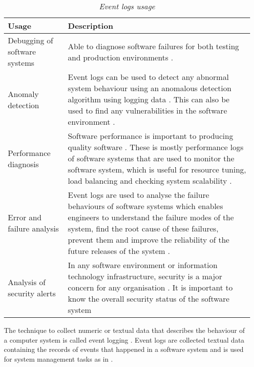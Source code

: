 \begin{table}[!htb]
	\centering
	\small
	\caption[Event logs usage]
	{\textit{Event logs usage}}
	\label{tbl:CH1_EventLogsUsage}
	\begin{tabularx}{\textwidth}{|l|X|}
		\hline \textbf{Usage} & \textbf{Description} \\
		\hline Debugging of software systems & Able to diagnose software failures for both testing and production environments \cite{Rong2018a}.\\
		\hline Anomaly detection & Event logs can be used to detect any abnormal system behaviour using an anomalous detection algorithm using logging data \cite{Gurumdimma2016}. This can also be used to find any vulnerabilities in the software environment \cite{Dwyer2013}. \\
		\hline Performance diagnosis & Software performance is important to producing quality software \cite{EvangelinGeetha2007,Baccanico2014}. These is mostly performance logs of software systems that are used to monitor the software system, which is useful for resource tuning, load balancing and checking system scalability \cite{Song2017}. \\ 
		\hline Error and failure analysis & Event logs are used to analyse the failure behaviours of software systems which enables engineers to understand the failure modes of the system, find the root cause of these failures, prevent them and improve the reliability of the future releases of the system \cite{Cinque2013}.\\
		\hline Analysis of security alerts & In any software environment or information technology infrastructure, security is a major concern for any organisation \cite{Pathan2014, Dwyer2013}. It is important to know the overall security status of the software system \\
		\hline
	\end{tabularx}
\end{table}

The technique to collect numeric or textual data that describes the behaviour of a computer system is called event logging \cite{Pecchia2015, Baccanico2014}. Event logs are collected textual data containing the records of events that happened in a software system and is used for system management tasks as in  \cite{Rong2018a, Rong2018, Baccanico2014}.


